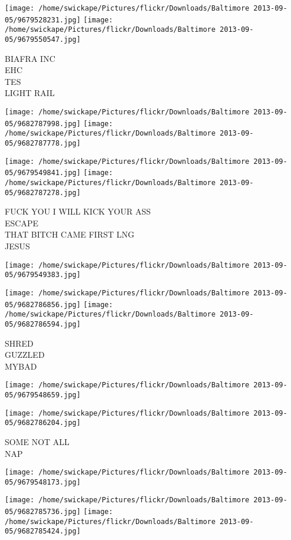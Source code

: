 \documentclass[10pt,letterpaper]{article}
\begin{document}
\texttt{[image: /home/swickape/Pictures/flickr/Downloads/Baltimore 2013-09-05/9679528231.jpg]}
\texttt{[image: /home/swickape/Pictures/flickr/Downloads/Baltimore 2013-09-05/9679550547.jpg]}

BIAFRA INC\\
EHC\\
TES\\
LIGHT RAIL
\pagebreak

\texttt{[image: /home/swickape/Pictures/flickr/Downloads/Baltimore 2013-09-05/9682787998.jpg]}
\texttt{[image: /home/swickape/Pictures/flickr/Downloads/Baltimore 2013-09-05/9682787778.jpg]}

\texttt{[image: /home/swickape/Pictures/flickr/Downloads/Baltimore 2013-09-05/9679549841.jpg]}
\texttt{[image: /home/swickape/Pictures/flickr/Downloads/Baltimore 2013-09-05/9682787278.jpg]}

FUCK YOU I WILL KICK YOUR ASS\\
ESCAPE\\
THAT BITCH CAME FIRST LNG\\
JESUS
\pagebreak

\texttt{[image: /home/swickape/Pictures/flickr/Downloads/Baltimore 2013-09-05/9679549383.jpg]}

\vspace{0.25in}
\texttt{[image: /home/swickape/Pictures/flickr/Downloads/Baltimore 2013-09-05/9682786856.jpg]}
\texttt{[image: /home/swickape/Pictures/flickr/Downloads/Baltimore 2013-09-05/9682786594.jpg]}

SHRED\\
GUZZLED\\
MYBAD
\pagebreak

\texttt{[image: /home/swickape/Pictures/flickr/Downloads/Baltimore 2013-09-05/9679548659.jpg]}

\vspace{0.25in}
\texttt{[image: /home/swickape/Pictures/flickr/Downloads/Baltimore 2013-09-05/9682786204.jpg]}

SOME NOT ALL\\
NAP
\pagebreak

\texttt{[image: /home/swickape/Pictures/flickr/Downloads/Baltimore 2013-09-05/9679548173.jpg]}

\vspace{0.25in}
\texttt{[image: /home/swickape/Pictures/flickr/Downloads/Baltimore 2013-09-05/9682785736.jpg]}
\texttt{[image: /home/swickape/Pictures/flickr/Downloads/Baltimore 2013-09-05/9682785424.jpg]}
\end{document}
